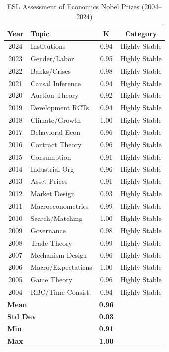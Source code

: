 \documentclass[11pt,a4paper]{article}
\begin{document}
\begin{table}[h]
\centering
\caption{ESL Assessment of Economics Nobel Prizes (2004--2024)}
\begin{tabular}{clcc}
\toprule
\textbf{Year} & \textbf{Topic} & \textbf{K} & \textbf{Category} \\
\midrule
2024 & Institutions & 0.94 & Highly Stable \\
2023 & Gender/Labor & 0.95 & Highly Stable \\
2022 & Banks/Crises & 0.98 & Highly Stable \\
2021 & Causal Inference & 0.94 & Highly Stable \\
2020 & Auction Theory & 0.92 & Highly Stable \\
2019 & Development RCTs & 0.94 & Highly Stable \\
2018 & Climate/Growth & 1.00 & Highly Stable \\
2017 & Behavioral Econ & 0.96 & Highly Stable \\
2016 & Contract Theory & 0.96 & Highly Stable \\
2015 & Consumption & 0.91 & Highly Stable \\
2014 & Industrial Org & 0.96 & Highly Stable \\
2013 & Asset Prices & 0.91 & Highly Stable \\
2012 & Market Design & 0.93 & Highly Stable \\
2011 & Macroeconometrics & 0.99 & Highly Stable \\
2010 & Search/Matching & 1.00 & Highly Stable \\
2009 & Governance & 0.98 & Highly Stable \\
2008 & Trade Theory & 0.99 & Highly Stable \\
2007 & Mechanism Design & 0.96 & Highly Stable \\
2006 & Macro/Expectations & 1.00 & Highly Stable \\
2005 & Game Theory & 0.96 & Highly Stable \\
2004 & RBC/Time Consist. & 0.94 & Highly Stable \\
\midrule
\multicolumn{2}{l}{\textbf{Mean}} & \textbf{0.96} & \\
\multicolumn{2}{l}{\textbf{Std Dev}} & \textbf{0.03} & \\
\multicolumn{2}{l}{\textbf{Min}} & \textbf{0.91} & \\
\multicolumn{2}{l}{\textbf{Max}} & \textbf{1.00} & \\
\bottomrule
\end{tabular}
\end{table}
\end{document}
